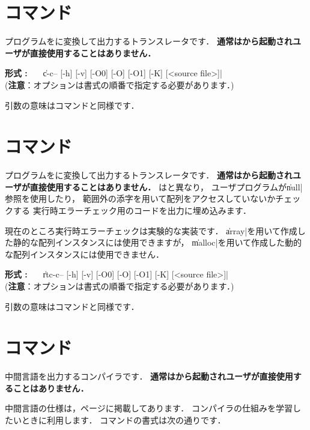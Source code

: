 \section{{\ccmmc}コマンド}
\label{command:ccmmc}

{\cmm}プログラムを{\cl}に変換して出力するトランスレータです．
{\bf 通常は{\cmc}から起動されユーザが直接使用することはありません．}

\begin{flushleft}
{\bf 形式 : }~~~\|c-c-- [-h] [-v] [-O0] [-O] [-O1] [-K] [<source file>]|\\
({\bf 注意}：オプションは書式の順番で指定する必要があります．)
\end{flushleft}

引数の意味は{\cmmc}コマンドと同様です．

\section{{\rtccmmc}コマンド}
\label{command:rtccmmc}

{\cmm}プログラムを{\cl}に変換して出力するトランスレータです．
{\bf 通常は{\cmc}から起動されユーザが直接使用することはありません．}
{\rtccmmc}は{\ccmmc}と異なり，
ユーザプログラムが\|null|参照を使用したり，
範囲外の添字を用いて配列をアクセスしていないかチェックする
実行時エラーチェック用のコードを出力に埋め込みます．

現在のところ実行時エラーチェックは実験的な実装です．
\|array|を用いて作成した静的な配列インスタンスには使用できますが，
\|malloc|を用いて作成した動的な配列インスタンスには使用できません．

\begin{flushleft}
{\bf 形式 : }~~~\|rtc-c-- [-h] [-v] [-O0] [-O] [-O1] [-K] [<source file>]|\\
({\bf 注意}：オプションは書式の順番で指定する必要があります．)
\end{flushleft}

引数の意味は{\cmmc}コマンドと同様です．

\section{{\icmmc}コマンド}
\label{command:icmmc}

中間言語を出力する{\cmm}コンパイラです．
{\bf 通常は{\cmi}から起動されユーザが直接使用することはありません．}

中間言語の仕様は，\pageref{app:vm}ページに掲載してあります．
コンパイラの仕組みを学習したいときに利用します．
{\icmmc}コマンドの書式は次の通りです．

